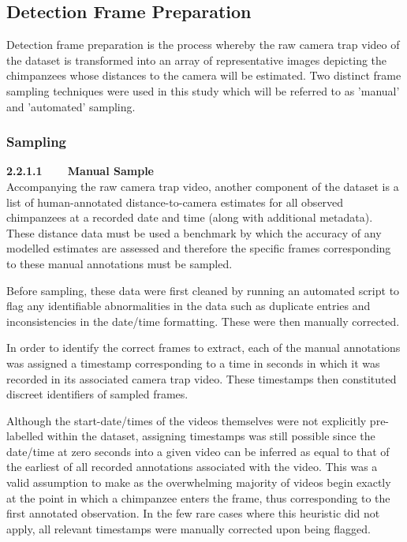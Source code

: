 \subsection{Detection Frame Preparation}

Detection frame preparation is the process whereby the raw camera trap video of the dataset
is transformed into an array of representative images depicting the chimpanzees whose
distances to the camera will be estimated.
Two distinct frame sampling techniques were used in this study which will be referred to as
'manual' and 'automated' sampling.

\vspace{-3mm}

\subsubsection{Sampling}

\textbf{2.2.1.1~~~~Manual Sample}\vspace{4.5mm}\\
Accompanying the raw camera trap video, another component of the dataset is a list of
human-annotated distance-to-camera estimates for all observed chimpanzees at a recorded
date and time (along with additional metadata).
These distance data must be used a benchmark by which the accuracy of any modelled estimates
are assessed and therefore the specific frames corresponding to these manual annotations must
be sampled.

Before sampling, these data were first cleaned by running an automated script to flag any
identifiable abnormalities in the data such as duplicate entries and inconsistencies in the
date/time formatting.
These were then manually corrected.

In order to identify the correct frames to extract, each of the manual annotations was assigned
a timestamp corresponding to a time in seconds in which it was recorded in its associated camera
trap video.
These timestamps then constituted discreet identifiers of sampled frames.

Although the start-date/times of the videos themselves were not explicitly pre-labelled within
the dataset, assigning timestamps was still possible since the date/time at zero seconds into
a given video can be inferred as equal to that of the earliest of all recorded annotations
associated with the video.
This was a valid assumption to make as the overwhelming majority of videos begin exactly at the
point in which a chimpanzee enters the frame, thus corresponding to the first annotated observation.
In the few rare cases where this heuristic did not apply, all relevant timestamps were manually
corrected upon being flagged.

